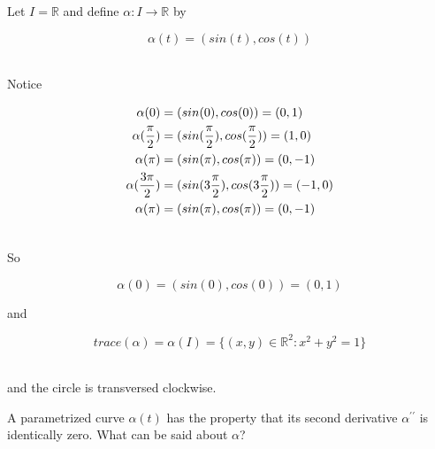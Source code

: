 \documentclass[12pt,letterpaper]{hmcpset}
\begin{document}
\begin{solution}

Let $I = \mathbb{R}$ and define $\alpha : I \to \mathbb{R}$  by

\[ \alpha(t) = (sin(t),cos(t)) \]\

Notice

\begin{align}
\alpha(0) &= (sin(0),cos(0)) = (0,1) \notag\\
\alpha(\frac{\pi}{2}) &= (sin(\frac{\pi}{2}),cos(\frac{\pi}{2})) = (1,0) \notag\\
\alpha(\pi) &= (sin(\pi),cos(\pi)) = (0,-1) \notag\\
\alpha(\frac{3\pi}{2}) &= (sin(3\frac{\pi}{2}),cos(3\frac{\pi}{2})) = (-1,0) \notag\\
\alpha(\pi) &= (sin(\pi),cos(\pi)) = (0,-1) \notag\\
\notag
\end{align}

So 

\[\alpha(0) = (sin(0),cos(0)) = (0,1)\]

 and 

\[trace(\alpha) = \alpha(I) = \{(x,y)\in \mathbb{R}^2: x^2 +y^2 =1\}\] \
 
and the circle is transversed clockwise.

\end{solution}



\newpage



\begin{problem}
A parametrized curve $\alpha(t)$ has the property that its second derivative $\alpha^{\prime\prime}$ is identically zero.  What can be said about $\alpha$?
\end{problem}
\end{document}
